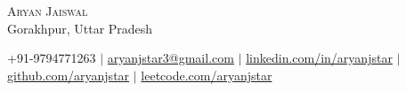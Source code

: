 \begin{center}
    {\Huge \scshape Aryan Jaiswal} \\ \vspace{3pt}
    Gorakhpur, Uttar Pradesh \\ \vspace{2pt}
    
    \small +91-9794771263 $|$ \href{mailto:aryanjstar3@gmail.com}{\color{blue}aryanjstar3@gmail.com} $|$ \href{https://linkedin.com/in/aryanjstar}{\color{blue}linkedin.com/in/aryanjstar} $|$ \href{https://github.com/aryanjstar}{\color{blue}github.com/aryanjstar} $|$ \href{https://leetcode.com/aryanjstar}{\color{blue}leetcode.com/aryanjstar}

    \vspace{2pt}
\end{center}
